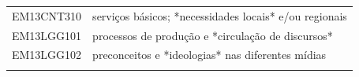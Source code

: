 \documentclass[12pt]{extarticle}
\begin{document}
\begin{longtable}{ll}
EM13CNT310 & serviços básicos; *necessidades locais* e/ou regionais                                                                                                                                                                                                                                                                                                                                                                                                                                                                                                                                                                                                                                                                                                                                                                \\
\rowcolor[HTML]{E0F7FA} 
EM13LGG101 & processos de produção e *circulação de discursos*                                                                                                                                                                                                                                                                                                                                                                                                                                                                                                                                                                                                                                                                                                                                                                     \\
\rowcolor[HTML]{FFF} 
EM13LGG102 & preconceitos e *ideologias* nas diferentes mídias                                                                                                                                                                                                                                                                                                                                                                                                                                                                                                                                                                                                                                                                                                                                                                     \\
\rowcolor[HTML]{E0F7FA} 

\end{longtable}
\end{document}
